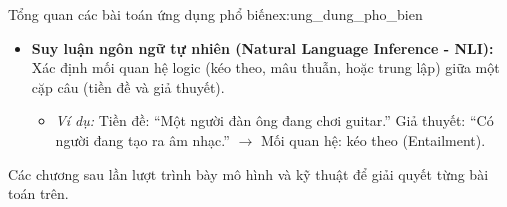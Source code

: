 \begin{example}{Tổng quan các bài toán ứng dụng phổ biến}{ex:ung_dung_pho_bien}
\begin{itemize}
            \begin{itemize}
                \item \textit{Ví dụ:} Chatbot hỗ trợ khách hàng, trợ lý ảo.
            \end{itemize}
        \item \textbf{Suy luận ngôn ngữ tự nhiên (Natural Language Inference - NLI):} Xác định mối quan hệ logic (kéo theo, mâu thuẫn, hoặc trung lập) giữa một cặp câu (tiền đề và giả thuyết).
            \begin{itemize}
                \item \textit{Ví dụ:} Tiền đề: “Một người đàn ông đang chơi guitar.” Giả thuyết: “Có người đang tạo ra âm nhạc.” $\rightarrow$ Mối quan hệ: kéo theo (Entailment).
            \end{itemize}
    \end{itemize}
\end{example}

Các chương sau lần lượt trình bày mô hình và kỹ thuật để giải quyết từng bài toán trên.